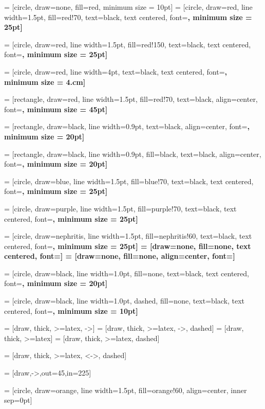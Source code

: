 
 = [circle, draw=none, fill=red, minimum size = 10pt]
 = [circle, draw=red, line width=1.5pt, fill=red!70, text=black, text centered, font=\bf \normalsize, minimum size = 25pt]

 = [circle, draw=red, line width=1.5pt, fill=red!150, text=black, text centered, font=\bf \normalsize, minimum size = 25pt]


 = [circle, draw=red, line width=4pt, text=black, text centered, font=\bf \normalsize, minimum size = 4.cm]

 = [rectangle, draw=red, line width=1.5pt, fill=red!70, text=black, align=center, font=\bf \normalsize, minimum size = 45pt]

 = [rectangle, draw=black, line width=0.9pt, text=black, align=center, font=\bf \normalsize, minimum size = 20pt]

 = [rectangle, draw=black, line width=0.9pt, fill=black, text=black, align=center, font=\bf \normalsize, minimum size = 20pt]

 = [circle, draw=blue, line width=1.5pt, fill=blue!70, text=black, text centered, font=\bf \normalsize, minimum size = 25pt]

 = [circle, draw=purple, line width=1.5pt, fill=purple!70, text=black, text centered, font=\bf \normalsize, minimum size = 25pt]


 = [circle, draw=nephritis, line width=1.5pt, fill=nephritis!60, text=black, text centered, font=\bf \normalsize, minimum size = 25pt]
 = [draw=none, fill=none, text centered, font=\bf \normalsize]
 = [draw=none, fill=none, align=center, font=\bf \normalsize]

 = [circle, draw=black, line width=1.0pt, fill=none, text=black, text centered, font=\bf \normalsize, minimum size = 20pt]

 = [circle, draw=black, line width=1.0pt, dashed, fill=none, text=black, text centered, font=\bf \normalsize, minimum size = 10pt]


  = [draw, thick, >=latex, ->]
  = [draw, thick, >=latex, ->, dashed]
  = [draw, thick, >=latex]
  = [draw, thick, >=latex, dashed]

  = [draw, thick, >=latex, <->, dashed]

 = [draw,->,out=45,in=225]


 = [circle, draw=orange, line width=1.5pt, fill=orange!60, align=center, inner sep=0pt]

